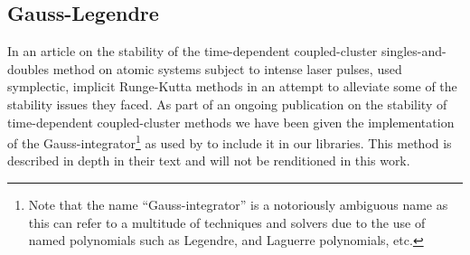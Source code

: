         \subsection{Gauss-Legendre}
            In an article on the stability of the time-dependent coupled-cluster
            singles-and-doubles method on atomic systems subject to intense
            laser pulses, \citeauthor{pedersen2018symplectic}
            \cite{pedersen2018symplectic} used symplectic, implicit Runge-Kutta
            methods in an attempt to alleviate some of the stability issues they
            faced.
            As part of an ongoing publication on the stability of time-dependent
            coupled-cluster methods \cite{oa-stability} we have been given the
            implementation of the Gauss-integrator\footnote{%
                Note that the name ``Gauss-integrator'' is a notoriously
                ambiguous name as this can refer to a multitude of techniques
                and solvers due to the use of named polynomials such as
                Legendre, and Laguerre polynomials, etc.%
            } as used by \citeauthor{pedersen2018symplectic}
            \cite{pedersen2018symplectic} to include it in our libraries.
            This method is described in depth in their text
             \cite{pedersen2018symplectic} and
            will not be renditioned in this work.

\clearemptydoublepage
